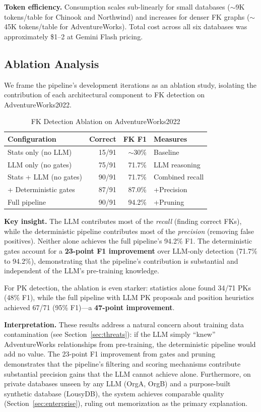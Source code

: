 \documentclass[sigconf, nonacm]{acmart}
\begin{document}
\textbf{Token efficiency.} Consumption scales sub-linearly for small databases ($\sim$9K tokens/table for Chinook and Northwind) and increases for denser FK graphs ($\sim$45K tokens/table for AdventureWorks). Total cost across all six databases was approximately \$1--2 at Gemini Flash pricing.

\subsection{Ablation Analysis}\label{sec:ablation}

We frame the pipeline's development iterations as an ablation study, isolating the contribution of each architectural component to FK detection on AdventureWorks2022.

\begin{table}[htbp]
\caption{FK Detection Ablation on AdventureWorks2022}
\label{tab:ablation}
\begin{tabular}{lrrl}
\toprule
\textbf{Configuration} & \textbf{Correct} & \textbf{FK F1} & \textbf{Measures} \\
\midrule
Stats only (no LLM) & 15/91 & $\sim$30\% & Baseline \\
LLM only (no gates) & 75/91 & 71.7\% & LLM reasoning \\
Stats + LLM (no gates) & 90/91 & 71.7\% & Combined recall \\
+ Deterministic gates & 87/91 & 87.0\% & +Precision \\
Full pipeline & 90/91 & 94.2\% & +Pruning \\
\bottomrule
\end{tabular}
\end{table}

\textbf{Key insight.} The LLM contributes most of the \emph{recall} (finding correct FKs), while the deterministic pipeline contributes most of the \emph{precision} (removing false positives). Neither alone achieves the full pipeline's 94.2\% F1. The deterministic gates account for a \textbf{23-point F1 improvement} over LLM-only detection (71.7\% to 94.2\%), demonstrating that the pipeline's contribution is substantial and independent of the LLM's pre-training knowledge.

For PK detection, the ablation is even starker: statistics alone found 34/71 PKs (48\% F1), while the full pipeline with LLM PK proposals and position heuristics achieved 67/71 (95\% F1)---a \textbf{47-point improvement}.

\textbf{Interpretation.} These results address a natural concern about training data contamination (see Section~\ref{sec:threats}): if the LLM simply ``knew'' AdventureWorks relationships from pre-training, the deterministic pipeline would add no value. The 23-point F1 improvement from gates and pruning demonstrates that the pipeline's filtering and scoring mechanisms contribute substantial precision gains that the LLM cannot achieve alone. Furthermore, on private databases unseen by any LLM (OrgA, OrgB) and a purpose-built synthetic database (LousyDB), the system achieves comparable quality (Section~\ref{sec:enterprise}), ruling out memorization as the primary explanation.
\end{document}
